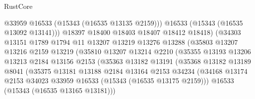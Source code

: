 \begin{lexlean}{RustCore}
\begin{coremodule}
                                  @33959
                                  @16533
                                  (@15343 (@16535 @13135 @2159)))
                                @16533
                                (@15343 (@16535 @13092 @13141)))
                              @18397
                              @18400
                              @18403
                              @18407
                              @18412
                              @18418)
                            (@34303
                              @13151
                              @1789
                              @1794
                              @11
                              @13207
                              @13219
                              @13276
                              @13288
                              (@35803
                                @13207
                                @13216
                                @2159
                                @13219
                                (@35810
                                  @13207
                                  @13214
                                  @2210
                                  (@35355
                                    @13193
                                    @13206
                                    @13213
                                    @2184
                                    @13156
                                    @2153
                                    (@35363
                                      @13182
                                      @13191
                                      (@35368
                                        @13182
                                        @13189
                                        @8041
                                        (@35375
                                          @13181
                                          @13188
                                          @2184
                                          @13164
                                          @2153
                                          @34234
                                          (@34168
                                            @13174
                                            @2153
                                            @34023
                                            @33959
                                            @16533
                                            (@15343 (@16535 @13175 @2159)))
                                          @16533
                                          (@15343 (@16535 @13165 @13181)))

\end{coremodule}
\end{lexlean}
